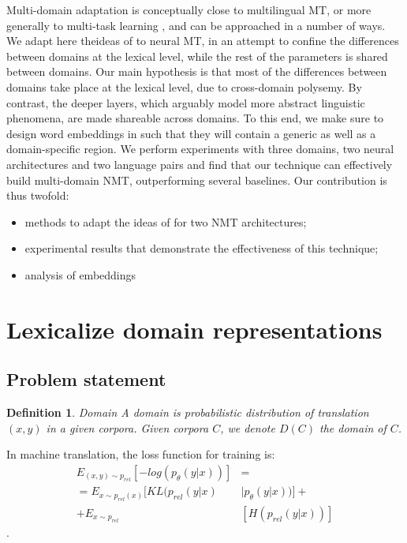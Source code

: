 \documentclass[11pt,a4paper]{article}
\newtheorem{definition}{Definition}[section]
\newcommand{\fyTodo}[1]{\Todo[FY:]{\textcolor{orange}{#1}}}
\newcommand{\fyDone}[1]{\done[FY]\Todo[FY:]{\textcolor{orange}{#1}}}
\begin{document}
Multi-domain adaptation is conceptually close to multilingual MT, or more generally to multi-task learning \cite{Caruana97multitask}, and can be approached in a number of ways. We adapt here theideas of \cite{Daume07frustratingly} to neural MT, in an attempt to confine the differences between domains at the lexical level, while the rest of the parameters is shared between domains. Our main hypothesis is that most of the differences between domains take place at the lexical level, due to cross-domain polysemy. By contrast, the deeper layers, which arguably model more abstract linguistic phenomena, are made shareable across domains.
To this end, we make sure to design word embeddings in such that they will contain a generic as well as a domain-specific region. We perform experiments with three domains, two neural architectures and two language pairs and find that our technique can effectively build multi-domain NMT, outperforming several baselines. Our contribution is thus twofold:
\begin{itemize}
\item methods to adapt the ideas of \cite{Daume07frustratingly} for two NMT architectures;
\item experimental results that demonstrate the effectiveness of this technique;
\item analysis of embeddings
\end{itemize}
\fyTodo{can we train in random order ? can we get away with catastrophic forgetting ?}
\fyTodo{how to analyze the embeddings ? how can we test or claim ?}

\section{Lexicalize domain representations\label{sec:lexicalized_embeddings}}
\fyDone{Use meaningful titles throughout}

\subsection{Problem statement \label{ssec:statement}}
\fyTodo{Use math for notation, label equations and such}
\begin{definition}{Domain}
\label{def:domain}
A domain is probabilistic distribution of translation $(x,y)$ in a given corpora. Given corpora $C$, we denote $D(C)$ the domain of $C$.
\end{definition}
\fyTodo{We need more: the source, the target, etc}
In machine translation, the loss function for training is:
\begin{equation}\label{eq:1}
\begin{split}
E_{(x,y) \sim p_{rel}}[-log(p_{\theta}(y|x))] &= \\
= E_{x \sim p_{rel}(x)}[KL(p_{rel}(y|x) & \mid p_{\theta}(y|x))] + \\
+ E_{x \sim p_{rel}} &[H(p_{rel}(y|x))]
\end{split}
\end{equation}.
\end{document}

